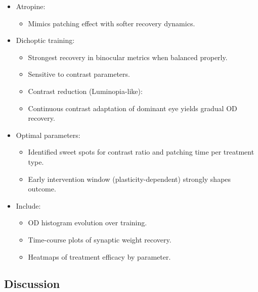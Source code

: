 \documentclass[
]{article}
\providecommand{\tightlist}{%
  \setlength{\itemsep}{0pt}\setlength{\parskip}{0pt}}
\begin{document}
\begin{itemize}
  \begin{itemize}
  \tightlist
  \item[$\square$]
    Effective in early periods; risk of reverse amblyopia with excessive
    patching.
  \end{itemize}
\item[$\square$]
  Atropine:

  \begin{itemize}
  \tightlist
  \item[$\square$]
    Mimics patching effect with softer recovery dynamics.
  \end{itemize}
\item[$\square$]
  Dichoptic training:

  \begin{itemize}
  \tightlist
  \item[$\square$]
    Strongest recovery in binocular metrics when balanced properly.
  \item[$\square$]
    Sensitive to contrast parameters.
  \item[$\square$]
    Contrast reduction (Luminopia-like):
  \item[$\square$]
    Continuous contrast adaptation of dominant eye yields gradual OD
    recovery.
  \end{itemize}
\item[$\square$]
  Optimal parameters:

  \begin{itemize}
  \tightlist
  \item[$\square$]
    Identified sweet spots for contrast ratio and patching time per
    treatment type.
  \item[$\square$]
    Early intervention window (plasticity-dependent) strongly shapes
    outcome.
  \end{itemize}
\item[$\square$]
  Include:

  \begin{itemize}
  \tightlist
  \item[$\square$]
    OD histogram evolution over training.
  \item[$\square$]
    Time-course plots of synaptic weight recovery.
  \item[$\square$]
    Heatmaps of treatment efficacy by parameter.
  \end{itemize}
\end{itemize}

\subsection{Discussion}\label{sec:discussion}
\end{document}
